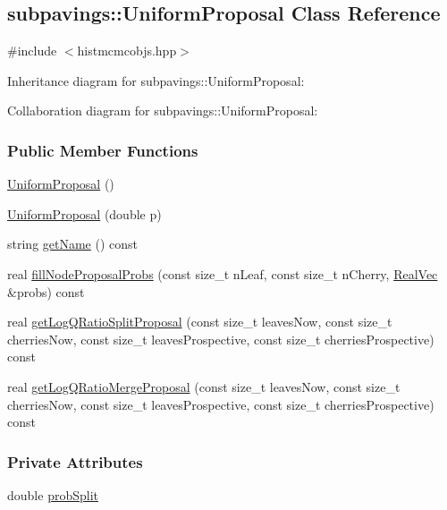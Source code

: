 \hypertarget{classsubpavings_1_1UniformProposal}{\subsection{subpavings\-:\-:\-Uniform\-Proposal \-Class \-Reference}
\label{classsubpavings_1_1UniformProposal}
}


{\ttfamily \#include $<$histmcmcobjs.\-hpp$>$}



\-Inheritance diagram for subpavings\-:\-:\-Uniform\-Proposal\-:


\-Collaboration diagram for subpavings\-:\-:\-Uniform\-Proposal\-:
\subsubsection*{\-Public \-Member \-Functions}
\begin{DoxyCompactItemize}
\item 
\hyperlink{classsubpavings_1_1UniformProposal_a48ba54810e93ef39de822b3a23152ada}{\-Uniform\-Proposal} ()
\item 
\hyperlink{classsubpavings_1_1UniformProposal_a136a544cbf9a088c25d5a044cfb4707e}{\-Uniform\-Proposal} (double p)
\item 
string \hyperlink{classsubpavings_1_1UniformProposal_aef037393c168f70b5849813233d7e594}{get\-Name} () const 
\item 
real \hyperlink{classsubpavings_1_1UniformProposal_a78acb8553a9e2f18f0c1accf3519b75f}{fill\-Node\-Proposal\-Probs} (const size\-\_\-t n\-Leaf, const size\-\_\-t n\-Cherry, \hyperlink{namespacesubpavings_af2d57bb6e12f4a73169f2e496d6a641f}{\-Real\-Vec} \&probs) const 
\item 
real \hyperlink{classsubpavings_1_1UniformProposal_a34e427b990aebdf8ea302693da8952ea}{get\-Log\-Q\-Ratio\-Split\-Proposal} (const size\-\_\-t leaves\-Now, const size\-\_\-t cherries\-Now, const size\-\_\-t leaves\-Prospective, const size\-\_\-t cherries\-Prospective) const 
\item 
real \hyperlink{classsubpavings_1_1UniformProposal_a0dd552bd6b2f9cfb4eb94e2a3efc5d57}{get\-Log\-Q\-Ratio\-Merge\-Proposal} (const size\-\_\-t leaves\-Now, const size\-\_\-t cherries\-Now, const size\-\_\-t leaves\-Prospective, const size\-\_\-t cherries\-Prospective) const 
\end{DoxyCompactItemize}
\subsubsection*{\-Private \-Attributes}
\begin{DoxyCompactItemize}
\item 
double \hyperlink{classsubpavings_1_1UniformProposal_a9f7fb09d33d58ac7bc938369d3ad4e3d}{prob\-Split}
\end{DoxyCompactItemize}


